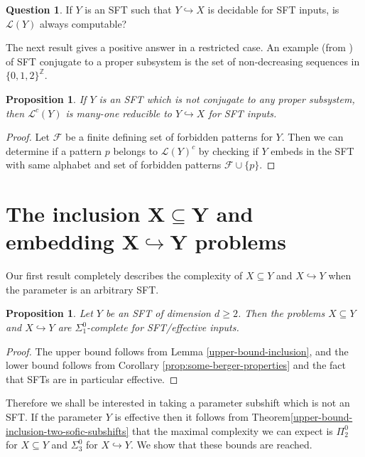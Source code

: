 \documentclass[a4paper]{article}
\newcommand{\Le}{\mathcal{L}}
\newcommand{\Z}{\mathbb{Z}}
\newtheorem{proposition}[theorem]{Proposition}
\theoremstyle{definition}
\newtheorem{question}[theorem]{Question}
\begin{document}
\begin{question}If $Y$ is an SFT such that $Y \hookrightarrow X$ is decidable for SFT inputs, is $\Le(Y)$ always computable?
\end{question}

The next result gives a positive answer in a restricted case. An example (from \cite{pavlov_structure_2023}) of SFT conjugate to a proper subsystem is the set of non-decreasing sequences in $\{0,1,2\}^\Z$.

\begin{proposition}
    If $Y$ is an SFT which is not conjugate to any proper subsystem, then $\Le^c(Y)$ is many-one reducible to $Y \hookrightarrow X$ for SFT inputs.
\end{proposition}  

\begin{proof}
    Let $\mathcal F$ be a finite defining set of forbidden patterns for $Y$. Then we can determine if a pattern $p$ belongs to $\Le(Y)^c$ by checking if $Y$ embeds in the SFT with same alphabet and set of forbidden patterns $\mathcal F\cup\{p\}$.
\end{proof}

\section{The inclusion $\mathbf{X\subseteq Y}$ and embedding $\mathbf{X\hookrightarrow Y}$ problems}\label{sec:X-contained-in-Y-and-X-embeds-Y} 
Our first result completely describes the complexity of $X \subseteq Y$ and $X \hookrightarrow Y$ when the parameter is an arbitrary SFT.

\begin{proposition}
    Let $Y$ be an SFT of dimension $d\geq 2$. Then the problems $X\subseteq Y$ and $X\hookrightarrow Y$ are $\Sigma_1^0$-complete for SFT/effective inputs. 
\end{proposition}


\begin{proof}
    The upper bound follows from Lemma \ref{upper-bound-inclusion}, and the lower bound follows from Corollary \ref{prop:some-berger-properties} and the fact that SFTs are in particular effective. 
\end{proof}
Therefore we shall be interested in taking a parameter subshift which is not an SFT. If the parameter $Y$ is effective then 
it follows from Theorem\ref{upper-bound-inclusion-two-sofic-subshifts} that the maximal complexity we can expect is $\Pi_2^0$ for $X\subseteq Y$ and $\Sigma_3^0$ for $X\hookrightarrow Y$. We show that these bounds are reached.
\end{document}
